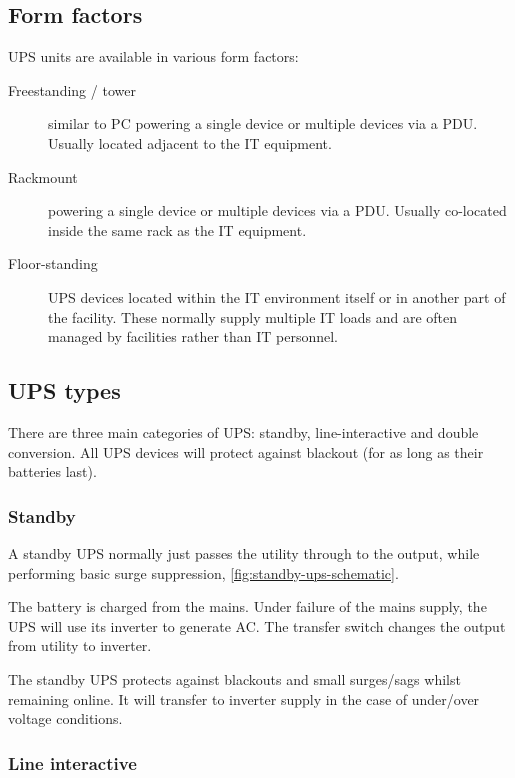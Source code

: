 \documentclass{pgnotes}
\begin{document}
\subsection{Form factors}

UPS units are available in various form factors:
\begin{description}
\item[Freestanding / tower] similar to PC powering a single device or multiple devices via a PDU.  Usually located adjacent to the IT equipment.
\item[Rackmount] powering a single device or multiple devices via a PDU. Usually co-located inside the same rack as the IT equipment.
\item[Floor-standing] UPS devices located within the IT environment itself or in another part of the facility. These normally supply multiple IT loads and are often managed by facilities rather than IT personnel. 
\end{description}


\newpage
\subsection{UPS types}

There are three main categories of UPS: standby, line-interactive and double conversion. 
All UPS devices will protect against blackout (for as long as their batteries last).

\subsubsection{Standby}

A standby UPS normally just passes the utility through to the output, while performing basic surge suppression, \autoref{fig:standby-ups-schematic}.


The battery is charged from the mains.
Under failure of the mains supply, the UPS will use its inverter to generate AC.
The transfer switch changes the output from utility to inverter.

The standby UPS protects against blackouts and small surges/sags whilst remaining online.
It will transfer to inverter supply in the case of under/over voltage conditions.

\subsubsection{Line interactive}
\end{document}
